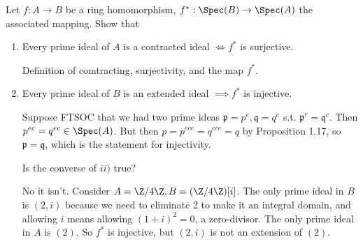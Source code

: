 \begin{questions}
\question Let $f: A\to B $ be a ring homomorphism, $f^{\ast}: \Spec(B) \to \Spec(A) $ the associated mapping. Show that
\begin{enumerate}
\item Every prime ideal of $A $ is a contracted ideal $\iff f^\ast $ is surjective.
\begin{solution}
	Definition of comtracting, surjectivity, and the map $f^\ast $.
\end{solution}
\item Every prime ideal of $B $ is an extended ideal $\implies f^\ast $ is injective.
\begin{solution}
	Suppose FTSOC that we had two prime ideas $\mathfrak{p} = p^e,\mathfrak{q} = q^e$ s.t. $\mathfrak{p}^c = \mathfrak{q}^c $.
	Then $p^{ec} = q^{ec} \in \Spec(A)$.
	But then $p = p^{ece} = q^{ece} = q $ by Proposition 1.17, so $\mathfrak{p} = \mathfrak{q} $, which is the statement for injectivity.
\end{solution}
Is the converse of $ii) $ true?
\begin{solution}
	No it isn't. Consider $A = \Z / 4\Z, B = (\Z / 4 \Z)[i] $.
	The only prime ideal in $B $ is $(2,i) $ because we need to eliminate 2 to make it an integral domain, and allowing $i $ means allowing $(1+i)^2 = 0 $, a zero-divisor.
	The only prime ideal in $A $ is $(2)$.
	So $f^\ast $ is injective, but $(2,i) $ is not an extension of $(2) $.
\end{solution}
\end{enumerate}


\end{questions}
